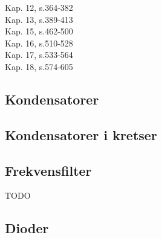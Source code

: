 Kap. 12, s.364-382 \\
Kap. 13, s.389-413 \\
Kap. 15, s.462-500 \\
Kap. 16, s.510-528 \\
Kap. 17, s.533-564 \\
Kap. 18, s.574-605

\subsection{Kondensatorer}


\subsection{Kondensatorer i kretser}


\subsection{Frekvensfilter}
TODO

\subsection{Dioder}

